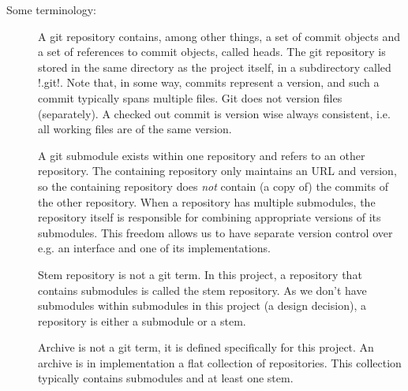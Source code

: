 \noindent
Some terminology:
\begin{description}
\item[] A git repository contains, among other things, a set of
      commit objects and a set of references to commit objects, called heads.
      The git repository is stored in the same directory as the project itself,
      in a subdirectory called !.git!. Note that, in some way, commits
      represent a version, and such a commit typically spans multiple files.
      Git does not version files (separately). A checked out commit is version
      wise always consistent, i.e. all working files are of the same version.
\item[] A git submodule exists within one repository and refers
      to an other repository. The containing repository only maintains an URL
      and version, so the containing repository does \emph{not} contain (a
      copy of) the commits of the other repository. When a repository has
      multiple submodules, the repository itself is responsible for combining
      appropriate versions of its submodules. This freedom allows us to have
      separate version control over e.g. an interface and one of its
      implementations.
\item[] Stem repository is not a git term. In this
      project, a repository that contains submodules is called the stem
      repository. As we don't have submodules within submodules in this project
      (a design decision), a repository is either a submodule or a stem.
\item[] Archive is not a git term, it is defined specifically for
      this project. An archive is in implementation a flat collection of
      repositories. This collection typically contains submodules and at least
      one stem.
\end{description}

